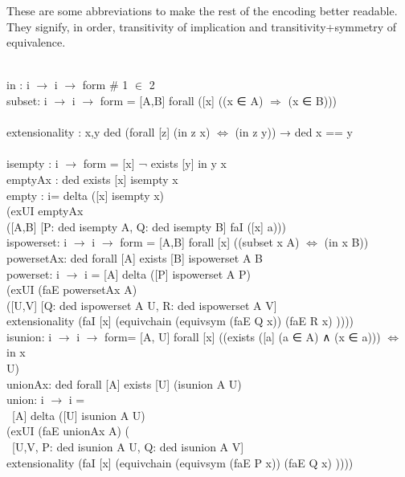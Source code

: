 \documentclass{article}
\begin{document}
These are some abbreviations to make the rest of the encoding better readable. They signify, in order, transitivity of implication and transitivity+symmetry of equivalence.
\begin{listing}
\\
  in : i $\rightarrow$ i $\rightarrow$ form \# 1 $\in$ 2\\
  subset: i $\rightarrow$ i $\rightarrow$ form = [A,B] forall ([x] ((x ‍∈ A) $\Rightarrow$ (x ‍∈ B)))\\
  \\
  extensionality : {x,y} ded (forall [z] (in z x) $\Leftrightarrow$ (in z y))  →  ded x == y\\
  \\
  isempty : i $\rightarrow$ form = [x]  ¬ exists [y] in y x\\
  emptyAx : ded exists [x] isempty x\\
  empty : i= delta ([x] isempty x) \\
             (exUI emptyAx \\
              ([A,B] [P: ded isempty A, Q: ded isempty B] faI ([x] a))) \\
  	
  ispowerset: i $\rightarrow$ i $\rightarrow$ form = [A,B]	forall [x] ((subset x A)  $\Leftrightarrow$ (in x B))	\\		
  powersetAx: ded forall [A] exists [B] ispowerset A B   \\
  powerset: i $\rightarrow$ i = [A] delta ([P] ispowerset A P) \\
  					(exUI (faE powersetAx A)\\
  					([U,V] [Q: ded ispowerset A U, R: ded ispowerset A V]\\
  					extensionality (faI [x] (equivchain (equivsym (faE Q x)) (faE R x) ))))\\
  
  isunion: i $\rightarrow$ i $\rightarrow$ form= [A, U]	forall [x] ((exists ([a] (a ‍∈ A) ∧ (x ‍∈ a))) $\Leftrightarrow$ in x\\ U)			\\
  unionAx: ded forall [A] exists [U] (isunion A U)\\
  union: i $\rightarrow$ i = \\
  			\ 	[A] delta ([U] isunion A U)\\
  				(exUI (faE unionAx A) (\\
  		\ 		[U,V, P: ded isunion A U, Q: ded isunion A V]\\
  				extensionality (faI [x] (equivchain (equivsym (faE P x)) (faE Q x) ))))\\
   					

\end{listing}
\end{document}
